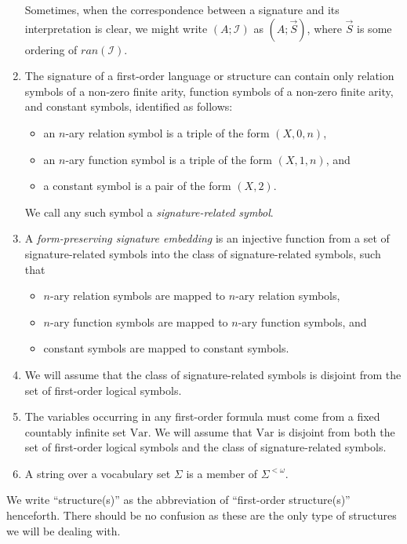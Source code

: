 \documentclass[12pt]{article}
\numberwithin{equation}{section}
\begin{document}
\begin{con}
\begin{enumerate}[label=(\arabic*)]
    Sometimes, when the correspondence between a signature and its interpretation is clear, we might write $(A; \mathcal{I})$ as $(A; \Vec{S})$, where $\Vec{S}$ is some ordering of $ran(\mathcal{I})$.
    \item The signature of a first-order language or structure can contain only relation symbols of a non-zero finite arity, function symbols of a non-zero finite arity, and constant symbols, identified as follows:
    \begin{itemize}
        \item an $n$-ary relation symbol is a triple of the form $(X, 0, n)$,
        \item an $n$-ary function symbol is a triple of the form $(X, 1, n)$, and
        \item a constant symbol is a pair of the form $(X, 2)$.
    \end{itemize}
    We call any such symbol a \emph{signature-related symbol}.
    \item A \emph{form-preserving signature embedding} is an injective function from a set of signature-related symbols into the class of signature-related symbols, such that
    \begin{itemize}
        \item $n$-ary relation symbols are mapped to $n$-ary relation symbols,
        \item $n$-ary function symbols are mapped to $n$-ary function symbols, and
        \item constant symbols are mapped to constant symbols.
    \end{itemize}
    \item\label{227} We will assume that the class of signature-related symbols is disjoint from the set of first-order logical symbols.
    \item\label{224} The variables occurring in any first-order formula must come from a fixed countably infinite set $\mathrm{Var}$. We will assume that $\mathrm{Var}$ is disjoint from both the set of first-order logical symbols and the class of signature-related symbols.
    \item A string over a vocabulary set $\Sigma$ is a member of $\Sigma^{< \omega}$.
\end{enumerate}
\end{con}

We write ``structure(s)'' as the abbreviation of ``first-order structure(s)'' henceforth. There should be no confusion as these are the only type of structures we will be dealing with.
\end{document}
